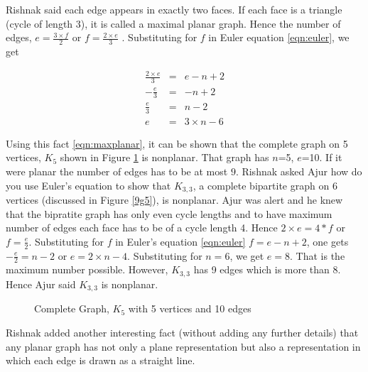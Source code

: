 Rishnak said each edge appears in exactly two faces. If each face is a triangle (cycle of length 3), it is called a maximal planar graph. Hence the number of edges, $e=\frac{3 \times f}{2}$ or $f=\frac{2 \times e}{3}$ . Substituting for $f$ in Euler equation \ref{eqn:euler}, we get

\begin{eqnarray*}
    \label{eqn:maxplanar}
    \frac{2\times e}{3}&=&e-n+2\\
    -\frac{e}{3} &=&-n+2\\
    \frac{e}{3}&=&n-2\\
    e&=& 3 \times n - 6
\end{eqnarray*}

Using this fact \ref{eqn:maxplanar}, it can be shown that the complete graph on 5 vertices, $K_5$ shown in Figure \ref{9g10} is nonplanar. That graph has $n$=5, $e$=10. If it were planar the number of edges has to be at most $9$. 
Rishnak asked Ajur how do you use Euler's equation to show that $K_{3,3}$, a complete bipartite graph on 6 vertices (discussed in Figure \ref{9g5}), is nonplanar. 
Ajur was alert and he knew that the bipratite graph has only even cycle lengths and to have maximum number of edges each face has to be of a cycle length 4. Hence $2\times e =4*f$ or $f=\frac{e}{2}$. Substituting for $f$ in Euler's equation \ref{eqn:euler}
$f=e-n+2$, one gets $-\frac{e}{2}=n-2$ or $e=2\times n -4$. Substituting for $n=6$, we get $e=8$. That is the maximum number possible. However, $K_{3,3}$ has 9 edges which is more than 8. Hence Ajur said $K_{3,3}$ is nonplanar.
\begin{figure}
\begin{center}
\caption{ Complete Graph, $K_5$ with 5 vertices and 10 edges }\label{9g10}
\end{center}
\end{figure}
Rishnak added another interesting fact (without adding any further details) that any planar graph has not only a plane representation but also a representation in which each edge is drawn as a straight line.

